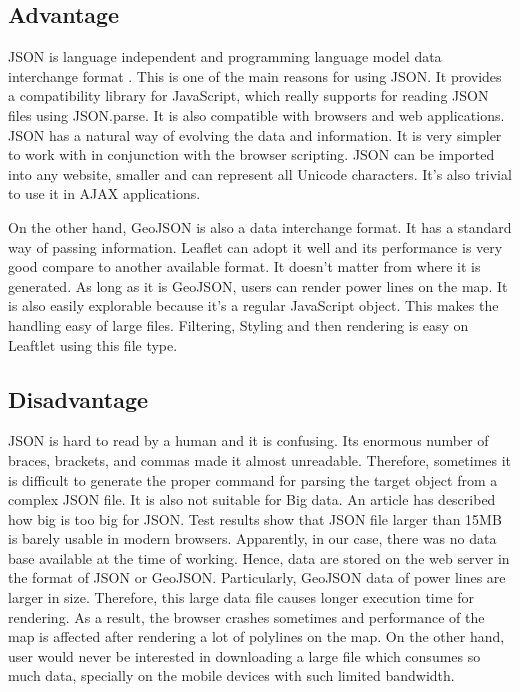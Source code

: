 \subsection{Advantage}

JSON is language independent and programming language model data interchange format \cite{jsonfatfree2006}. This is one of the main reasons for using JSON. It provides a compatibility library for JavaScript, which really supports for reading JSON files using JSON.parse. It is also compatible with browsers and web applications. JSON has a natural way of evolving the data and information. It is very simpler to work with in conjunction with the browser scripting. JSON can be imported into any website, smaller and can represent all Unicode characters. It's also trivial to use it in AJAX applications.
 
On the other hand, GeoJSON is also a data interchange format. It has a standard way of passing information. Leaflet can adopt it well and its performance is very good compare to another available format. It doesn't matter from where it is generated. As long as it is GeoJSON, users can render power lines on the map. It is also easily explorable because it's a regular JavaScript object. This makes the handling easy of large files. Filtering, Styling and then rendering is easy on Leaftlet using this file type.

\subsection{Disadvantage}

JSON is hard to read by a human and it is confusing. Its enormous number of braces, brackets, and commas made it almost unreadable. Therefore, sometimes it is difficult to generate the proper command for parsing the target object from a complex JSON file. It is also not suitable for Big data.  An article \cite{jsontoobig} has described how big is too big for JSON.  Test results show that JSON file larger than 15MB is barely usable in modern browsers. Apparently, in our case, there was no data base available at the time of working. Hence, data are stored on the web server in the format of JSON or GeoJSON. Particularly, GeoJSON data of power lines are larger in size. Therefore, this large data file causes longer execution time for rendering. As a result, the browser crashes sometimes and performance of the map is affected after rendering a lot of polylines on the map. On the other hand, user would never be interested in downloading a large file which consumes so much data, specially on the mobile devices with such limited bandwidth.

